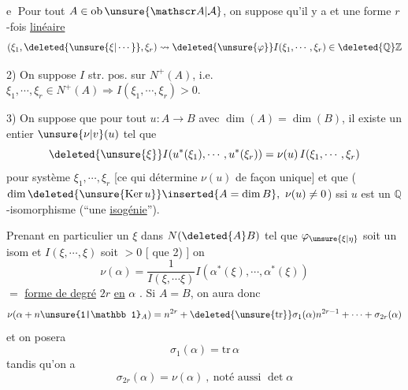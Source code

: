 
\textcircled{e} Pour tout $A\in\mathrm{ob}\,\unsure{\mathscr A|\mathcal A}$, on suppose qu'il y a  et une forme $r$-fois \uline{linéaire}
\[
(\xi_1,\deleted{\unsure{\xi|\cdots}},\xi_r)\leadsto
\deleted{\unsure{\varphi}}I(\xi_1,\cdots,\xi_r)\in\deleted{\mathbb Q}\mathbb Z
\]

2) On suppose $I$  str. pos. sur $N^+(A)$, i.e. $\xi_1,\cdots,\xi_r\in N^+(A)\Rightarrow I(\xi_1,\cdots,\xi_r)>0$.


3) On suppose que pour tout  $u:A\longrightarrow B$  avec $\dim(A)=\dim(B)$,  il existe un entier  $\unsure{\nu|v}(u)$ tel que
\[
\deleted{\unsure{\xi}} I(u^*(\xi_1),\cdots,u^*(\xi_r))=\nu(u)\,I(\xi_1,\cdots,\xi_r)
\]
pour  système $\xi_1,\cdots,\xi_r$ [ce qui détermine $\nu(u)$ de façon unique]\deleted{, \unsure{et} cf. plus \unsure{haut}]} et que ($\dim\deleted{\unsure{\mathrm{Ker}\,u}}\inserted{A=\dim B},\ \nu(u)\ne0$) ssi $u$ est un $\mathbb Q$-isomorphisme (``une \uline{isogénie}'').

Prenant en particulier  un $\xi$ dans $N(\deleted{A}B)$ tel que $\varphi_{\unsure{\xi|\eta}}$ soit un isom et $I(\xi,\cdots,\xi)$ soit $>0$ [  que 2) ] on 
\[
\nu(\alpha)=\frac{1}{I(\xi,\cdots\xi)}I(\alpha^*(\xi),\cdots,\alpha^*(\xi))
\]
$={}$ \uline{forme de degré} $2r$ \uline{en} $\alpha$ . Si $A=B$, on aura donc
\[
\nu(\alpha+n\unsure{1|\mathbb 1}_A)=n^{2r}+\deleted{\unsure{\mathrm{tr}}}\sigma_1(\alpha)n^{2r-1}+\cdots+\sigma_{2r}(\alpha)
\]
et on posera
\[
\sigma_1(\alpha)=\mathrm{tr}\,\alpha
\]
tandis qu'on a
\[
\sigma_{2r}(\alpha)=\nu(\alpha)\ ,\ \text{noté aussi }\det\alpha
\]


